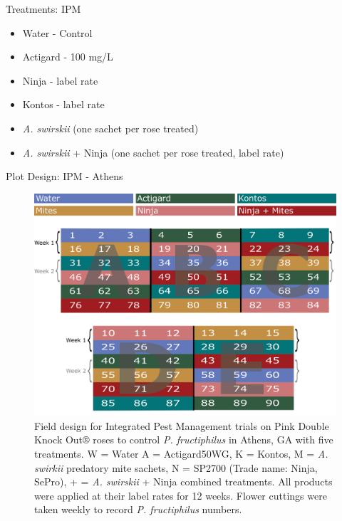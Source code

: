 \documentclass[
  ignorenonframetext,
]{beamer}
\providecommand{\tightlist}{%
  \setlength{\itemsep}{0pt}\setlength{\parskip}{0pt}}
\begin{document}
\begin{frame}
\begin{block}{Treatments: IPM}
\protect\hypertarget{treatments-ipm}{}
\begin{itemize}
\tightlist
\item
  Water - Control
\item
  Actigard - 100 mg/L
\item
  Ninja - label rate
\item
  Kontos - label rate
\item
  \emph{A. swirskii} (one sachet per rose treated)
\item
  \emph{A. swirskii} + Ninja (one sachet per rose treated, label rate)
\end{itemize}
\end{block}

\begin{block}{Plot Design: IPM - Athens}
\protect\hypertarget{plot-design-ipm---athens}{}
\begin{figure}
\includegraphics[width=0.8\linewidth]{figure/rrv_ipm_plot_map_2019_athens} \caption{Field design for Integrated Pest Management trials on Pink Double Knock Out® roses to control \textit{P. fructiphilus} in Athens, GA with five treatments. W = Water A = Actigard50WG, K = Kontos, M = \textit{A. swirkii} predatory mite sachets, N = SP2700 (Trade name: Ninja, SePro), + = \textit{A. swirskii} + Ninja combined treatments. All products were applied at their label rates for 12 weeks. Flower cuttings were taken weekly to record \textit{P. fructiphilus} numbers.}\label{fig:ipm-athens}
\end{figure}
\end{block}


\end{frame}
\end{document}
